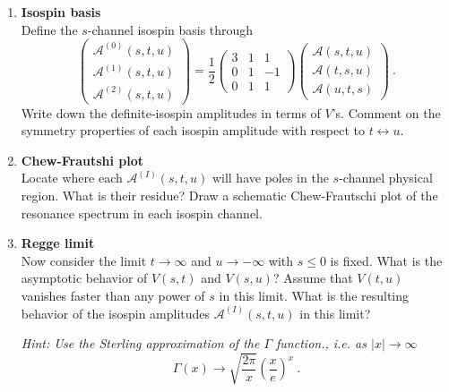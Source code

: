 \begin{enumerate}
    \item \textbf{Isospin basis} \\
          Define the $s$-channel isospin basis through
          \begin{equation}
              \begin{pmatrix}
                  \mathcal{A}^{(0)}(s,t,u) \\
                  \mathcal{A}^{(1)}(s,t,u) \\
                  \mathcal{A}^{(2)}(s,t,u)
              \end{pmatrix}
              =
              \frac{1}{2}\begin{pmatrix}
                  3 & 1 & 1  \\
                  0 & 1 & -1 \\
                  0 & 1 & 1
              \end{pmatrix}
              \begin{pmatrix}
                  \mathcal{A}(s,t,u) \\
                  \mathcal{A}(t,s,u) \\
                  \mathcal{A}(u,t,s)
              \end{pmatrix}
              ~.
          \end{equation}
          Write down the definite-isospin amplitudes in terms of $V$'s. Comment on the symmetry properties of each isospin amplitude with respect to $t \leftrightarrow u$.



    \item \textbf{Chew-Frautshi plot} \\
          Locate where each $\mathcal{A}^{(I)}(s,t,u)$ will have poles in the $s$-channel physical region. What is their residue? Draw a schematic Chew-Frautschi plot of the resonance spectrum in each isospin channel.

    \item \textbf{Regge limit} \\
          Now consider the limit $t \to \infty$ and $u \to - \infty$ with $s \leq 0$ is fixed. What is the asymptotic behavior of $V(s,t)$ and $V(s,u)$? Assume that $V(t,u)$ vanishes faster than any power of $s$ in this limit. What is the resulting behavior of the isospin amplitudes $\mathcal{A}^{(I)}(s,t,u)$ in this limit?

          \noindent \textit{ Hint: Use the Sterling approximation of the $\Gamma$ function., i.e. as $|x|\to \infty$
              \begin{equation}
                  \Gamma(x) \to \sqrt{\frac{2\pi}{x}} \left( \frac{x}{e} \right)^x ~.
              \end{equation}
          }


\end{enumerate}
